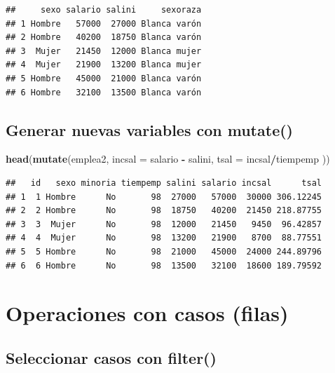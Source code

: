 \documentclass[]{book}
\newenvironment{Shaded}{\begin{snugshade}}{\end{snugshade}}
\newcommand{\DataTypeTok}[1]{\textcolor[rgb]{0.13,0.29,0.53}{#1}}
\newcommand{\KeywordTok}[1]{\textcolor[rgb]{0.13,0.29,0.53}{\textbf{#1}}}
\newcommand{\NormalTok}[1]{#1}
\newcommand{\OperatorTok}[1]{\textcolor[rgb]{0.81,0.36,0.00}{\textbf{#1}}}
\newcommand{\StringTok}[1]{\textcolor[rgb]{0.31,0.60,0.02}{#1}}
\begin{document}
\begin{verbatim}
##     sexo salario salini     sexoraza
## 1 Hombre   57000  27000 Blanca varón
## 2 Hombre   40200  18750 Blanca varón
## 3  Mujer   21450  12000 Blanca mujer
## 4  Mujer   21900  13200 Blanca mujer
## 5 Hombre   45000  21000 Blanca varón
## 6 Hombre   32100  13500 Blanca varón
\end{verbatim}

\hypertarget{generar-nuevas-variables-con-mutate}{%
\subsection{\texorpdfstring{Generar nuevas variables con \textbf{mutate()}}{Generar nuevas variables con mutate()}}\label{generar-nuevas-variables-con-mutate}}

\begin{Shaded}
\begin{Highlighting}[]
\KeywordTok{head}\NormalTok{(}\KeywordTok{mutate}\NormalTok{(emplea2, }\DataTypeTok{incsal =}\NormalTok{ salario }\OperatorTok{-}\StringTok{ }\NormalTok{salini, }\DataTypeTok{tsal =}\NormalTok{ incsal}\OperatorTok{/}\NormalTok{tiempemp ))}
\end{Highlighting}
\end{Shaded}

\begin{verbatim}
##   id   sexo minoria tiempemp salini salario incsal      tsal
## 1  1 Hombre      No       98  27000   57000  30000 306.12245
## 2  2 Hombre      No       98  18750   40200  21450 218.87755
## 3  3  Mujer      No       98  12000   21450   9450  96.42857
## 4  4  Mujer      No       98  13200   21900   8700  88.77551
## 5  5 Hombre      No       98  21000   45000  24000 244.89796
## 6  6 Hombre      No       98  13500   32100  18600 189.79592
\end{verbatim}

\hypertarget{operaciones-con-casos-filas}{%
\section{Operaciones con casos (filas)}\label{operaciones-con-casos-filas}}

\hypertarget{seleccionar-casos-con-filter}{%
\subsection{\texorpdfstring{Seleccionar casos con \textbf{filter()}}{Seleccionar casos con filter()}}\label{seleccionar-casos-con-filter}}
\end{document}
